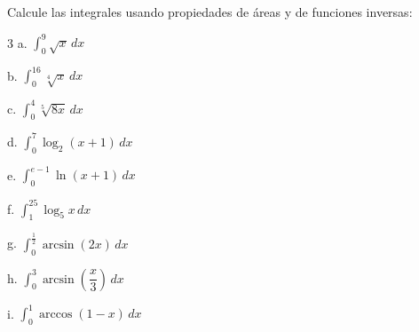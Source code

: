

\begin{ejer}{Calcule las integrales usando propiedades de áreas y de funciones inversas:}

\begin{multicols}{3}
a. $\displaystyle\int_{0}^{9}\sqrt{x}\,dx$


b. $\displaystyle\int_{0}^{16}\sqrt[4]{x}\,dx$


c. $\displaystyle\int_{0}^{4}\sqrt[5]{8x}\,dx$


d. $\displaystyle\int_{0}^{7}\log_{2}(x+1)\,dx$


e. $\displaystyle\int_{0}^{e-1}\ln(x+1)\,dx$


f. $\displaystyle\int_{1}^{25}\log_{5}x\,dx$


g. $\displaystyle\int_{0}^{\frac{1}{2}}\arcsin(2x)\,dx$


h. $\displaystyle\int_{0}^{3}\arcsin\left(\dfrac{x}{3}\right)\,dx$


i. $\displaystyle\int_{0}^{1}\arccos(1 - x)\,dx$
\end{multicols}
\end{ejer}
